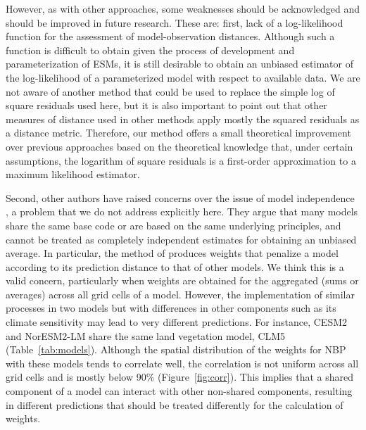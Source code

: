 \documentclass[gmd, manuscript]{copernicus}
\begin{document}
However, as with other approaches, some weaknesses should be acknowledged and should be improved in future research. These are: first, lack of a log-likelihood function for the assessment of model-observation distances. Although such a function is difficult to obtain given the process of development and parameterization of ESMs, it is still desirable to obtain an unbiased estimator of the log-likelihood of a parameterized model with respect to available data. We are not aware of another method that could be used to replace the simple log of square residuals used here, but it is also important to point out that other measures of distance used in other methods apply mostly the squared residuals as a distance metric. Therefore, our method offers a small theoretical improvement over previous approaches based on the theoretical knowledge that, under certain assumptions, the logarithm of square residuals is a first-order approximation to a maximum likelihood estimator. 

Second, other authors have raised concerns over the issue of model independence \citep{Knutti2010CC, Knutti2010JC}, a problem that we do not address explicitly here. They argue that many models share the same base code or are based on the same underlying principles, and cannot be treated as completely independent estimates for obtaining an unbiased average. In particular, the method of \citet{Knutti2017} produces weights that penalize a model according to its prediction distance to that of other models. We think this is a valid concern, particularly when weights are obtained for the aggregated (sums or averages) across all grid cells of a model. However, the implementation of similar processes in two models but with differences in other components such as its climate sensitivity may lead to very different predictions. For instance, CESM2 and NorESM2-LM share the same land vegetation model, CLM5 (Table~\ref{tab:models}). Although the spatial distribution of the weights for NBP with these models tends to correlate well, the correlation is not uniform across all grid cells and is mostly below 90\% (Figure~\ref{fig:corr}). This implies that a shared component of a model can interact with other non-shared components, resulting in different predictions that should be treated differently for the calculation of weights. 
\end{document}

